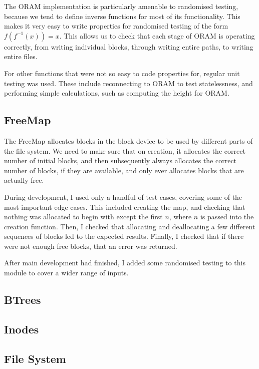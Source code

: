 \documentclass[12pt,a4paper,twoside,openright]{report}
\begin{document}
The ORAM implementation is particularly amenable to randomised testing, because we tend to define inverse functions for most of its functionality. This makes it very easy to write properties for randomised testing of the form $f(f^{-1}(x)) = x$. This allows us to check that each stage of ORAM is operating correctly, from writing individual blocks, through writing entire paths, to writing entire files.

For other functions that were not so easy to code properties for, regular unit testing was used. These include reconnecting to ORAM to test statelessness, and performing simple calculations, such as computing the height for ORAM.

\subsection{FreeMap}

The FreeMap allocates blocks in the block device to be used by different parts of the file system. We need to make sure that on creation, it allocates the correct number of initial blocks, and then subsequently always allocates the correct number of blocks, if they are available, and only ever allocates blocks that are actually free.

During development, I used only a handful of test cases, covering some of the most important edge cases. This included creating the map, and checking that nothing was allocated to begin with except the first $n$, where $n$ is passed into the creation function. Then, I checked that allocating and deallocating a few different sequences of blocks led to the expected results. Finally, I checked that if there were not enough free blocks, that an error was returned.

After main development had finished, I added some randomised testing to this module to cover a wider range of inputs.

\subsection{BTrees}

\subsection{Inodes}

\subsection{File System}
\end{document}
